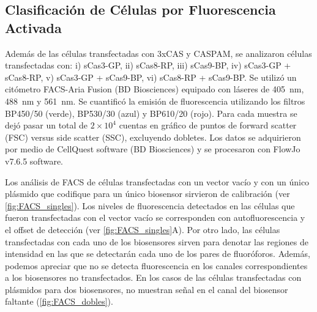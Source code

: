 \subsection{Clasificación de Células por Fluorescencia Activada}


Además de las células transfectadas con 3xCAS y CASPAM, se analizaron células transfectadas con: i) sCas3-GP, ii) sCas8-RP, iii) sCas9-BP, iv) sCas3-GP + sCas8-RP, v) sCas3-GP + sCas9-BP, vi) sCas8-RP + sCas9-BP. Se utilizó un citómetro FACS-Aria Fusion (BD Biosciences) equipado con láseres de 405~nm, 488~nm y 561~nm. Se cuantificó la emisión de fluorescencia utilizando los filtros BP450/50 (verde), BP530/30 (azul) y BP610/20 (rojo). Para cada muestra se dejó pasar un total de $2 \times 10^4$ cuentas en gráfico de puntos de forward scatter (FSC) versus side scatter (SSC), excluyendo dobletes. Los datos se adquirieron por medio de CellQuest software (BD Biosciences) y se procesaron con FlowJo v7.6.5 software.

Los análisis de FACS de células transfectadas con un vector vacío y con un único plásmido que codifique para un único biosensor sirvieron de calibración (ver \cref{fig:FACS_singles}). Los niveles de fluorescencia detectados en las células que fueron transfectadas con el vector vacío se corresponden con autofluorescencia y el offset de detección (ver \cref{fig:FACS_singles}A). Por otro lado, las células transfectadas con cada uno de los biosensores sirven para denotar las regiones de intensidad en las que se detectarán cada uno de los pares de fluoróforos. Además, podemos apreciar que no se detecta fluorescencia en los canales correspondientes a los biosensores no transfectados. En los casos de las células transfectadas con plásmidos para dos biosensores, no muestran señal en el canal del biosensor faltante (\cref{fig:FACS_dobles}).

